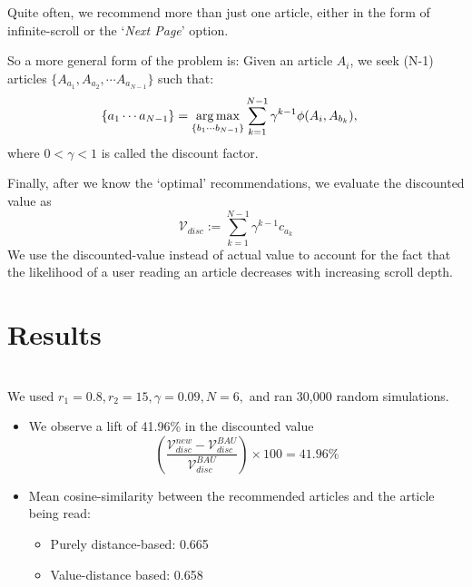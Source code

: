 \documentclass[11]{article}
\begin{document}

Quite often, we recommend more than just one article, either in the form of infinite-scroll or the `\textit{Next Page}' option.

So a more general form of the problem is:
Given an article $A_i$, we seek (N-1) articles $\{A_{a_1}, A_{a_2}, \cdots A_{a_{N-1}}\}$ such that:
\begin{align*}
\{a_1 \cdots a_{N-1}\} &= \operatorname*{arg\,max}_{\{b_1\cdots b_{{N-1}}\}}  \sum_{k=1}^{N-1}  \gamma^{k-1} \phi(A_i, A_{b_k}),
\end{align*}
where $0<\gamma<1$ is called the discount factor.

Finally, after we know the `optimal' recommendations, we evaluate the discounted value as \[\mathcal{V}_{disc}:=\sum_{k=1}^{N-1}  \gamma^{k-1} c_{a_k} \]
We use the discounted-value instead of actual value to account for the fact that the likelihood of a user reading an article decreases with increasing scroll depth.

\section{Results}

\\
We used $r_1=0.8, r_2=15, \gamma=0.09, N=6,$ and ran 30,000 random simulations.
\begin{itemize}
\item We observe a lift of 41.96\% in the discounted value
\[ \left( \dfrac{  \mathcal{V}^{new}_{disc}-\mathcal{V}^{BAU}_{disc}  }{\mathcal{V}^{BAU}_{disc} } \right) \times 100  =41.96\% \]

\item Mean cosine-similarity between the recommended articles and the article being read:
\begin{itemize}
\item Purely distance-based: 0.665
\item Value-distance based: 0.658
\end{itemize}
\end{itemize}
\end{document}
